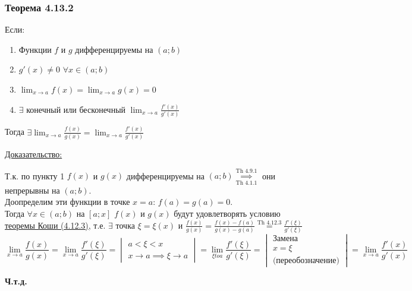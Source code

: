 \documentclass[12pt]{article}
\begin{document}
    \subsubsection*{Теорема 4.13.2}\label{th:4.13.2}
    \noindent Если: \begin{enumerate}
        \item Функции $f$ и $g$ дифференцируемы на $(a;b)$
        \item $g'(x) \ne 0$ $\forall x \in (a;b)$
        \item $\lim_{x\to a} f(x) = \lim_{x\to a}g(x) = 0$
        \item $\exists$ конечный или бесконечный $\lim_{x\to a} \frac{f'(x)}{g'(x)}$
    \end{enumerate}
    Тогда $\exists \lim_{x\to a}\frac{f(x)}{g(x)} = \lim_{x\to a}\frac{f'(x)}{g'(x)}$\par\noindent
    \underline{Доказательство:}
    \begin{adjustwidth}{1.5em}{1.5em}
        Т.к. по пункту 1 $f(x)$ и $g(x)$ дифференцируемы на $(a;b) \underset{\hyperref[th:4.1.1]{\text{Th 4.1.1}}}{\overset{\hyperref[th:4.9.1]{\text{Th 4.9.1}}}{\implies}}$ они непрерывны на $(a; b)$.\\
        Доопределим эти функции в точке $x = a$: $f(a) = g(a) = 0$.\\
        Тогда $\forall x \in (a; b)$ на $[a; x]$ $f(x)$ и $g(x)$ будут удовлетворять условию \hyperref[th:4.12.3]{теоремы Коши (4.12.3)}, т.е. $\exists$ точка $\xi = \xi(x)$ и $\frac{f(x)}{g(x)} = \frac{f(x) - f(a)}{g(x) - g(a)} \overset{\hyperref[th:4.12.3]{\text{Th 4.12.3}}}{=} \frac{f'(\xi)}{g'(\xi)}$
        \[ \boxed{\lim_{x \to a}\frac{f(x)}{g(x)}} = \lim_{x\to a}\frac{f'(\xi)}{g'(\xi)} = \begin{vmatrix}
            a < \xi < x\\
            x \to a \implies \xi \to a
        \end{vmatrix} = \lim_{\xi to a} \frac{f'(\xi)}{g'(\xi)} = \begin{vmatrix}
            \text{Замена}\\
            x = \xi\\
            \text{(переобозначение)}
        \end{vmatrix} = \boxed{\lim_{x\to a}\frac{f'(x)}{g'(x)}} \]
        \begin{center}
            \textbf{Ч.т.д.}
        \end{center}
    \end{adjustwidth}
\end{document}

